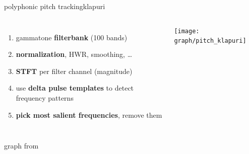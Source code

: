 	\begin{frame}{polyphonic pitch tracking}{klapuri}
        \begin{columns}[T]
                \begin{enumerate}
                    \item	gammatone \textbf{filterbank} (100 bands)
                    \item<2->	\textbf{normalization}, HWR, smoothing, \ldots
                    \item<3->	\textbf{STFT} per filter channel (magnitude)
                    \item<4->	use \textbf{delta pulse templates} to detect frequency patterns
                    \item<5->	\textbf{pick most salient frequencies}, remove them
                \end{enumerate}
                \texttt{[image: graph/pitch\_klapuri]}
        \end{columns}
    \bigskip
    
    \begin{flushright}
        graph from 
    \end{flushright}
	\end{frame}
 
